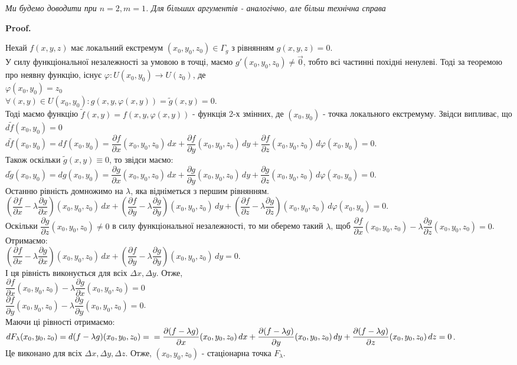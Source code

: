 \documentclass[a4paper, 10pt]{article}
\makeatletter
\def\departial#1#2{\dfrac{\partial {#1}}{\partial {#2}}}
\def\qed{$\blacksquare$}
\theoremstyle{theoremdd}
\theoremstyle{theoremdd}
\theoremstyle{theoremdd}
\theoremstyle{theoremdd}
\theoremstyle{theoremdd}
\theoremstyle{theoremdd}
\theoremstyle{theoremdd}
\theoremstyle{theoremdd}
\theoremstyle{theoremdd}
\renewenvironment{proof}[1][Proof.\\]{\par
\pushQED{\hfill \qed}%
\normalfont \topsep6\p@\@plus6\p@\relax
\trivlist
\item\relax
{\bfseries
#1\@addpunct{.}}\hspace\labelsep\ignorespaces
}{%
\popQED\endtrivlist\@endpefalse
}
\makeatother
\begin{document}
\textit{Ми будемо доводити при $n = 2, m = 1$. Для більших аргументів - аналогічно, але більш технічна справа}

\begin{proof}
Нехай $f(x,y,z)$ має локальний екстремум $(x_0,y_0,z_0) \in \Gamma_g$ з рівнянням $g(x,y,z) = 0$.\\
У силу функціональної незалежності за умовою в точці, маємо $g'(x_0,y_0,z_0) \neq \vec{0}$, тобто всі частинні похідні ненулеві. Тоді за теоремою про неявну функцію, існує $\varphi: U(x_0,y_0) \to U(z_0)$, де\\
$\varphi(x_0,y_0) = z_0$\\
$\forall (x,y) \in U(x_0,y_0): g(x,y,\varphi(x,y)) = \tilde{g}(x,y) = 0$.\\
Тоді маємо функцію $\tilde{f}(x,y) = f(x,y,\varphi(x,y))$ - функція 2-х змінних, де $(x_0,y_0)$ - точка локального екстремуму. Звідси випливає, що $d \tilde{f}(x_0,y_0) = 0$\\
$d\tilde{f}(x_0,y_0) = df(x_0,y_0) = \departial{f}{x}(x_0,y_0,z_0)\,dx + \departial{f}{y}(x_0,y_0,z_0)\,dy + \departial{f}{z}(x_0,y_0,z_0)\,d\varphi(x_0,y_0) = 0$.\\
Також оскільки $\tilde{g}(x,y) \equiv 0$, то звідси маємо:\\
$d\tilde{g}(x_0,y_0) = dg(x_0,y_0) = \departial{g}{x}(x_0,y_0,z_0)\,dx + \departial{g}{y}(x_0,y_0,z_0)\,dy + \departial{g}{z}(x_0,y_0,z_0)\,d\varphi(x_0,y_0) = 0$.\\
Останню рівність домножимо на $\lambda$, яка відніметься з першим рівнянням.\\
$\left( \departial{f}{x} - \lambda \departial{g}{x} \right)(x_0,y_0,z_0)\,dx + \left( \departial{f}{y} - \lambda \departial{g}{y} \right)(x_0,y_0,z_0)\,dy + \left( \departial{f}{z} - \lambda \departial{g}{z} \right)(x_0,y_0,z_0)\,d\varphi(x_0,y_0) = 0$.\\
Оскільки $\departial{g}{z}(x_0,y_0,z_0) \neq 0$ в силу функціональної незалежності, то ми оберемо такий $\lambda$, щоб $\departial{f}{x}(x_0,y_0,z_0) - \lambda \departial{g}{z}(x_0,y_0,z_0) = 0$. Отримаємо:\\
$\left( \departial{f}{x} - \lambda \departial{g}{x} \right)(x_0,y_0,z_0)\,dx + \left( \departial{f}{y} - \lambda \departial{g}{y} \right)(x_0,y_0,z_0)\,dy = 0$.\\
І ця рівність виконується для всіх $\Delta x, \Delta y$. Отже,\\
$\departial{f}{x}(x_0,y_0,z_0) - \lambda \departial{g}{x}(x_0,y_0,z_0) = 0$\\
$\departial{f}{y}(x_0,y_0,z_0) - \lambda \departial{g}{y}(x_0,y_0,z_0) = 0$.\\
Маючи ці рівності отримаємо:\\
$dF_{\lambda}(x_0,y_0,z_0) = d(f-\lambda g)(x_0,y_0,z_0) = \\ = \departial{(f-\lambda g)}{x}(x_0,y_0,z_0)\,dx + \departial{(f-\lambda g)}{y}(x_0,y_0,z_0)\,dy + \departial{(f-\lambda g)}{z}(x_0,y_0,z_0)\,dz = 0$.\\
Це виконано для всіх $\Delta x, \Delta y, \Delta z$. Отже, $(x_0,y_0,z_0)$ - стаціонарна точка $F_\lambda$.
\end{proof}
\end{document}
